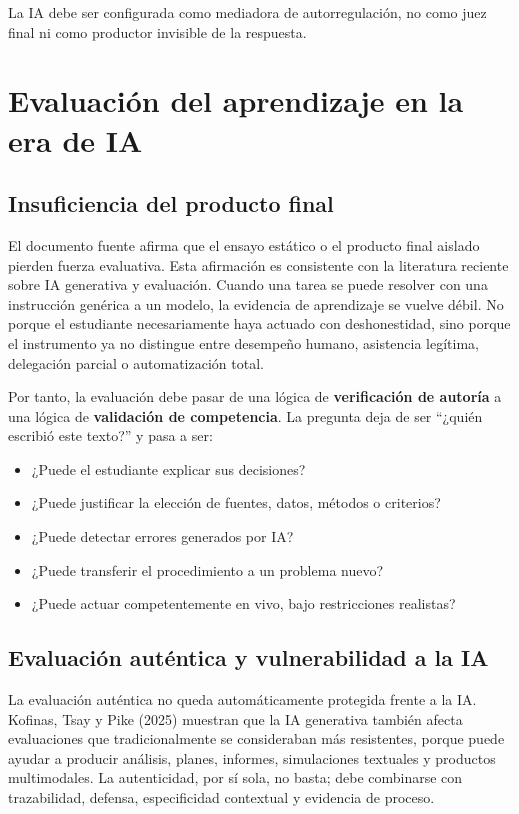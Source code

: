 \documentclass[
  spanish,
  letterpaper,
  DIV=11,
  numbers=noendperiod]{scrartcl}
\providecommand{\tightlist}{%
  \setlength{\itemsep}{0pt}\setlength{\parskip}{0pt}}
\begin{document}
La IA debe ser configurada como mediadora de autorregulación, no como
juez final ni como productor invisible de la respuesta.

\section{Evaluación del aprendizaje en la era de
IA}\label{evaluaciuxf3n-del-aprendizaje-en-la-era-de-ia}

\subsection{Insuficiencia del producto
final}\label{insuficiencia-del-producto-final}

El documento fuente afirma que el ensayo estático o el producto final
aislado pierden fuerza evaluativa. Esta afirmación es consistente con la
literatura reciente sobre IA generativa y evaluación. Cuando una tarea
se puede resolver con una instrucción genérica a un modelo, la evidencia
de aprendizaje se vuelve débil. No porque el estudiante necesariamente
haya actuado con deshonestidad, sino porque el instrumento ya no
distingue entre desempeño humano, asistencia legítima, delegación
parcial o automatización total.

Por tanto, la evaluación debe pasar de una lógica de
\textbf{verificación de autoría} a una lógica de \textbf{validación de
competencia}. La pregunta deja de ser ``¿quién escribió este texto?'' y
pasa a ser:

\begin{itemize}
\tightlist
\item
  ¿Puede el estudiante explicar sus decisiones?
\item
  ¿Puede justificar la elección de fuentes, datos, métodos o criterios?
\item
  ¿Puede detectar errores generados por IA?
\item
  ¿Puede transferir el procedimiento a un problema nuevo?
\item
  ¿Puede actuar competentemente en vivo, bajo restricciones realistas?
\end{itemize}

\subsection{Evaluación auténtica y vulnerabilidad a la
IA}\label{evaluaciuxf3n-autuxe9ntica-y-vulnerabilidad-a-la-ia}

La evaluación auténtica no queda automáticamente protegida frente a la
IA. Kofinas, Tsay y Pike (2025) muestran que la IA generativa también
afecta evaluaciones que tradicionalmente se consideraban más
resistentes, porque puede ayudar a producir análisis, planes, informes,
simulaciones textuales y productos multimodales. La autenticidad, por sí
sola, no basta; debe combinarse con trazabilidad, defensa, especificidad
contextual y evidencia de proceso.
\end{document}
